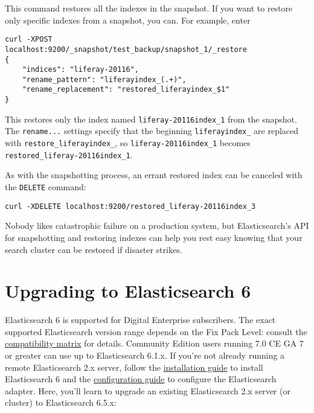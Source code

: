 This command restores all the indexes in the snapshot. If you want to
restore only specific indexes from a snapshot, you can. For example,
enter

\begin{verbatim}
curl -XPOST
localhost:9200/_snapshot/test_backup/snapshot_1/_restore
{
    "indices": "liferay-20116",
    "rename_pattern": "liferayindex_(.+)",
    "rename_replacement": "restored_liferayindex_$1"
}
\end{verbatim}

This restores only the index named \texttt{liferay-20116index\_1} from
the snapshot. The \texttt{rename...} settings specify that the beginning
\texttt{liferayindex\_} are replaced with
\texttt{restore\_liferayindex\_}, so \texttt{liferay-20116index\_1}
becomes \texttt{restored\_liferay-20116index\_1}.

As with the snapshotting process, an errant restored index can be
canceled with the \texttt{DELETE} command:

\begin{verbatim}
curl -XDELETE localhost:9200/restored_liferay-20116index_3
\end{verbatim}

Nobody likes catastrophic failure on a production system, but
Elasticsearch's API for snapshotting and restoring indexes can help you
rest easy knowing that your search cluster can be restored if disaster
strikes.

\section{Upgrading to Elasticsearch
6}\label{upgrading-to-elasticsearch-6}

Elasticsearch 6 is supported for Digital Enterprise subscribers. The
exact supported Elasticsearch version range depends on the Fix Pack
Level: consult the
\href{https://www.liferay.com/documents/10182/246659966/Liferay+DXP+7.0+Compatibility+Matrix.pdf}{compatibility
matrix} for details. Community Edition users running 7.0 CE GA 7 or
greater can use up to Elasticsearch 6.1.x. If you're not already running
a remote Elasticsearch 2.x server, follow the
\href{/docs/7-0/deploy/-/knowledge_base/d/installing-elasticsearch}{installation
guide} to install Elasticsearch 6 and the
\href{/docs/7-0/deploy/-/knowledge_base/d/configuring-elasticsearch-for-liferay-0}{configuration
guide} to configure the Elasticsearch adapter. Here, you'll learn to
upgrade an existing Elasticsearch 2.x server (or cluster) to
Elasticsearch 6.5.x:

